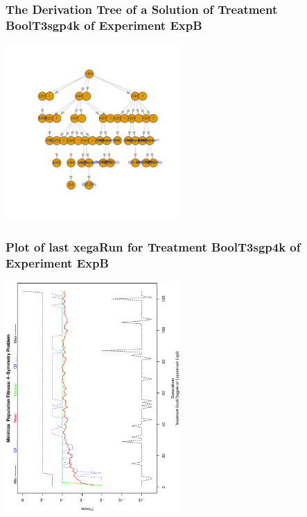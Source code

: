 \documentclass[18pt,c]{beamer}
\begin{document}
 \begin{frame}
 \frametitle{ The Derivation Tree of a Solution of Treatment BoolT3sgp4k of Experiment ExpB }
 \begin{center}
\includegraphics[width=0.5\textwidth, angle=0]
{ExpBDerivationTreeFigure017.pdf}
 \end{center}
 \label{report/ExpBDerivationTreeFigure017.pdf}  
 \end{frame}

 \begin{frame}
 \frametitle{ Plot of last xegaRun for Treatment BoolT3sgp4k of Experiment ExpB }
 \begin{center}
\includegraphics[width=0.5\textwidth, angle=-90]
{ExpBPlotPopStatsFigure017.eps}
 \end{center}
 \label{report/ExpBPlotPopStatsFigure017.eps}  
 \end{frame}
\end{document}
